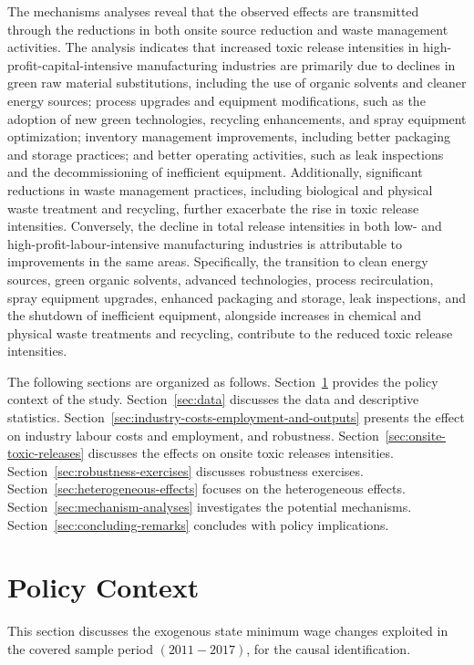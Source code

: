\documentclass[12pt, english]{article}
\begin{document}
    The mechanisms analyses reveal that the observed effects are transmitted through the reductions in both onsite source reduction and waste management activities. The analysis indicates that increased toxic release intensities in high-profit-capital-intensive manufacturing industries are primarily due to declines in green raw material substitutions, including the use of organic solvents and cleaner energy sources; process upgrades and equipment modifications, such as the adoption of new green technologies, recycling enhancements, and spray equipment optimization; inventory management improvements, including better packaging and storage practices; and better operating activities, such as leak inspections and the decommissioning of inefficient equipment. Additionally, significant reductions in waste management practices, including biological and physical waste treatment and recycling, further exacerbate the rise in toxic release intensities. Conversely, the decline in total release intensities in both low- and high-profit-labour-intensive manufacturing industries is attributable to improvements in the same areas. Specifically, the transition to clean energy sources, green organic solvents, advanced technologies, process recirculation, spray equipment upgrades, enhanced packaging and storage, leak inspections, and the shutdown of inefficient equipment, alongside increases in chemical and physical waste treatments and recycling, contribute to the reduced toxic release intensities.

    The following sections are organized as follows. Section~\ref{sec:policy-context} provides the policy context of the study. Section~\ref{sec:data} discusses the data and descriptive statistics. Section~\ref{sec:industry-costs-employment-and-outputs} presents the effect on industry labour costs and employment, and robustness. Section~\ref{sec:onsite-toxic-releases} discusses the effects on onsite toxic releases intensities. Section~\ref{sec:robustness-exercises} discusses robustness exercises. Section~\ref{sec:heterogeneous-effects} focuses on the heterogeneous effects. Section~\ref{sec:mechanism-analyses} investigates the potential mechanisms. Section~\ref{sec:concluding-remarks} concludes with policy implications.


    \section{Policy Context}\label{sec:policy-context}
    This section discusses the exogenous state minimum wage changes exploited in the covered sample period $(2011-2017)$, for the causal identification.
\end{document}
